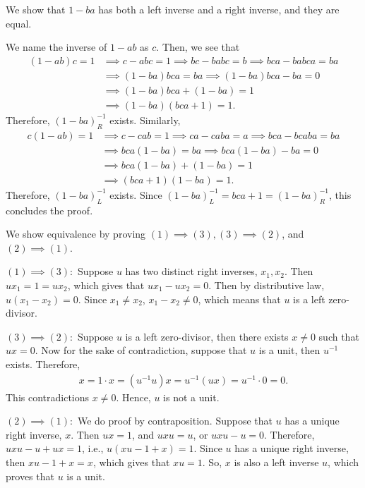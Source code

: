 \documentclass[12pt]{article}
\begin{document}
\begin{fproof}[Jacobson 2.2.4]
  We show that \(1-ba\) has both a left inverse and a right inverse, and they are equal.

  We name the inverse of \(1-ab\) as \(c\). Then, we see that
  \begin{align*}
    (1-ab)c = 1 & \implies c - abc = 1 \implies bc - babc = b \implies bca - babca = ba \\
    & \implies (1-ba)bca = ba \implies (1-ba)bca - ba = 0\\
    & \implies (1-ba)bca + (1-ba) = 1\\
    & \implies (1-ba)(bca + 1) = 1.
  \end{align*}
  Therefore, \((1-ba)^{-1}_R\) exists.
  Similarly,
  \begin{align*}
    c(1-ab) = 1 & \implies c - cab = 1 \implies ca - caba = a \implies bca - bcaba = ba\\
    & \implies bca(1-ba) = ba \implies bca(1-ba) - ba = 0\\
    & \implies bca(1-ba) + (1-ba) = 1\\
    & \implies (bca + 1)(1-ba) = 1.
  \end{align*}
  Therefore, \((1-ba)^{-1}_L\) exists.
  Since \((1-ba)^{-1}_L = bca+1 = (1-ba)^{-1}_R\), this concludes the proof.
\end{fproof}
\newpage

\begin{fproof}[Jacobson 2.2.6]
  We show equivalence by proving \((1) \implies (3), (3) \implies (2)\), and \((2) \implies (1)\).

  \((1) \implies (3):\)
  Suppose \(u\) has two distinct right inverses, \(x_1, x_2\).
  Then \(ux_1 = 1 = ux_2\), which gives that \(ux_1 - ux_2 = 0\).
  Then by distributive law, \(u(x_1-x_2) = 0\).
  Since \(x_1 \neq x_2\), \(x_1 - x_2 \neq 0\), which means that \(u\) is a left zero-divisor.

  \((3) \implies (2):\)
  Suppose \(u\) is a left zero-divisor, then there exists \(x \neq 0\) such that \(ux = 0\).
  Now for the sake of contradiction, suppose that \(u\) is a unit, then \(u^{-1}\) exists. 
  Therefore,
  \begin{align*}
    x = 1 \cdot x = (u^{-1}u)x = u^{-1}(ux) = u^{-1} \cdot 0 = 0.
  \end{align*}
  This contradictions \(x \neq 0\). Hence, \(u\) is not a unit.

  \((2) \implies (1):\)
  We do proof by contraposition.
  Suppose that \(u\) has a unique right inverse, \(x\).
  Then \(ux = 1\), and \(uxu = u\), or \(uxu-u=0\).
  Therefore, \(uxu - u+ux = 1\), i.e., \(u(xu-1+x) = 1\).
  Since \(u\) has a unique right inverse, then \(xu - 1 + x = x\), which gives that \(xu = 1\).
  So, \(x\) is also a left inverse \(u\), which proves that \(u\) is a unit.

\end{fproof}
\newpage

\begin{fproof}[Jacobson 2.2.7]\

\end{fproof}
\end{document}
